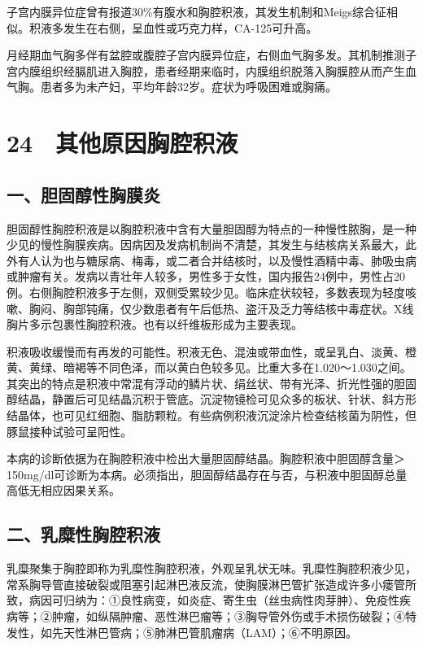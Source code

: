 子宫内膜异位症曾有报道30\%有腹水和胸腔积液，其发生机制和Meigs综合征相似。积液多发生在右侧，呈血性或巧克力样，CA-125可升高。

月经期血气胸多伴有盆腔或腹腔子宫内膜异位症，右侧血气胸多发。其机制推测子宫内膜组织经膈肌进入胸腔，患者经期来临时，内膜组织脱落入胸膜腔从而产生血气胸。患者多为未产妇，平均年龄32岁。症状为呼吸困难或胸痛。

\protect\hypertarget{text00076.html}{}{}

\section{24　其他原因胸腔积液}

\subsection{一、胆固醇性胸膜炎}

胆固醇性胸腔积液是以胸腔积液中含有大量胆固醇为特点的一种慢性脓胸，是一种少见的慢性胸膜疾病。因病因及发病机制尚不清楚，其发生与结核病关系最大，此外有人认为也与糖尿病、梅毒，或二者合并结核时，以及慢性酒精中毒、肺吸虫病或肿瘤有关。发病以青壮年人较多，男性多于女性，国内报告24例中，男性占20例。右侧胸腔积液多于左侧，双侧受累较少见。临床症状较轻，多数表现为轻度咳嗽、胸闷、胸部钝痛，仅少数患者有午后低热、盗汗及乏力等结核中毒症状。X线胸片多示包裹性胸腔积液。也有以纤维板形成为主要表现。

积液吸收缓慢而有再发的可能性。积液无色、混浊或带血性，或呈乳白、淡黄、橙黄、黄绿、暗褐等不同色泽，而以黄白色较多见。比重大多在1.020～1.030之间。其突出的特点是积液中常混有浮动的鳞片状、绢丝状、带有光泽、折光性强的胆固醇结晶，静置后可见结晶沉积于管底。沉淀物镜检可见众多的板状、针状、斜方形结晶体，也可见红细胞、脂肪颗粒。有些病例积液沉淀涂片检查结核菌为阴性，但豚鼠接种试验可呈阳性。

本病的诊断依据为在胸腔积液中检出大量胆固醇结晶。胸腔积液中胆固醇含量＞150mg/dl可诊断为本病。必须指出，胆固醇结晶存在与否，与积液中胆固醇总量高低无相应因果关系。

\subsection{二、乳糜性胸腔积液}

乳糜聚集于胸腔即称为乳糜性胸腔积液，外观呈乳状无味。乳糜性胸腔积液少见，常系胸导管直接破裂或阻塞引起淋巴液反流，使胸膜淋巴管扩张造成许多小瘘管所致，病因可归纳为：①良性病变，如炎症、寄生虫（丝虫病性肉芽肿）、免疫性疾病等；②肿瘤，如纵隔肿瘤、恶性淋巴瘤等；③胸导管外伤或手术损伤破裂；④特发性，如先天性淋巴管病；⑤肺淋巴管肌瘤病（LAM）；⑥不明原因。

